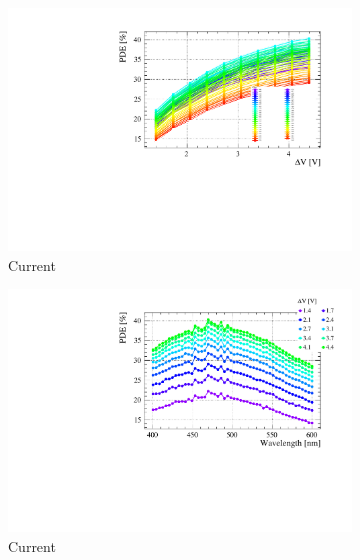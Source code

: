 \begin{landscape}
\begin{figure}[htbp]
    \centering
    \begin{subfigure}{0.65\textwidth}
        \includegraphics[width=\linewidth]{gfx/plots/PDE/H2017/c_Current_Bias.pdf} 
        \caption{Current}
    \end{subfigure}
    \begin{subfigure}{0.65\textwidth}
        \includegraphics[width=\linewidth]{gfx/plots/PDE/H2017/c_Current_Wavelength.pdf}  
        \caption{Current}
    \end{subfigure}
    \\
    \begin{subfigure}{0.65\textwidth}

\end{subfigure}
\end{figure}
\end{landscape}
